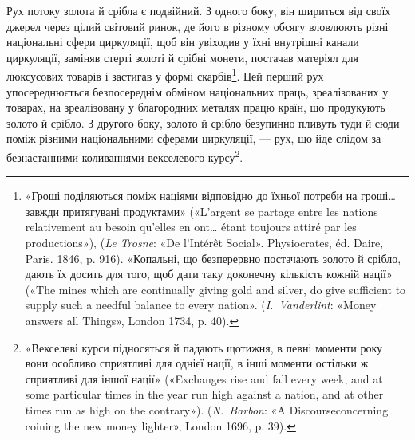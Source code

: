 Рух потоку золота й срібла є подвійний. З одного боку, він
шириться від своїх джерел через цілий світовий ринок, де його
в різному обсягу вловлюють різні національні сфери циркуляції,
щоб він увіходив у їхні внутрішні канали циркуляції, заміняв
стерті золоті й срібні монети, постачав матеріял для люксусових
товарів і застигав у формі скарбів\footnote{
«Гроші поділяються поміж націями відповідно до їхньої потреби
на гроші\dots{} завжди притягувані продуктами» («L’argent se partage
entre les nations relativement au besoin qu’elles en ont\dots{} étant toujours
attiré par les productions»), (\emph{Le Trosne}: «De l’Intérêt Social». Physiocrates,
éd. Daire, Paris. 1846, p. 916). «Копальні, що безперервно
постачають золото й срібло, дають їх досить для того, щоб дати таку
доконечну кількість кожній нації» («The mines which are continually giving
gold and silver, do give sufficient to supply such a needful balance to every
nation». (\emph{I.~Vanderlint}: «Money answers all Things», London 1734, p. 40).
}. Цей перший рух упосереднюється
безпосереднім обміном національних праць, зреалізованих
у товарах, на зреалізовану у благородних металях працю
країн, що продукують золото й срібло. З другого боку, золото
й срібло безупинно пливуть туди й сюди поміж різними національними
сферами циркуляції, — рух, що йде слідом за безнастанними
коливаннями векселевого курсу\footnote{
«Векселеві курси підносяться й падають щотижня, в певні моменти
року вони особливо сприятливі для однієї нації, в інші моменти
остільки ж сприятливі для іншої нації» («Exchanges rise and fall every
week, and at some particular times in the year run high against a nation,
and at other times run as high on the contrary»). (\emph{N.~Barbon}: «A Discourseconcerning
coining the new money lighter», London 1696, p. 39).
}.

